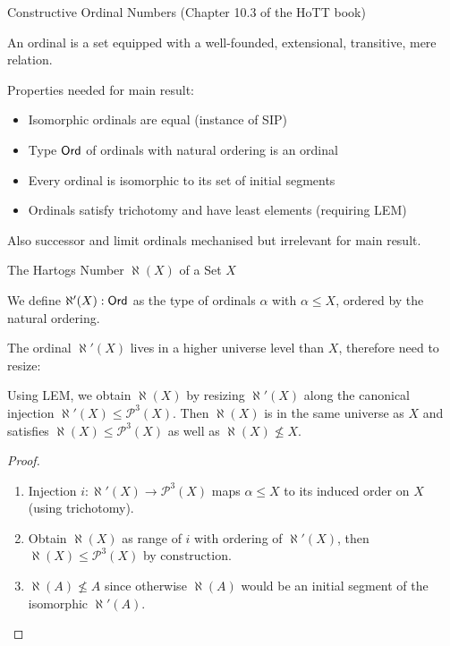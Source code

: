 \documentclass[xcolor=dvipsnames,compress,aspectratio=169,handout]{beamer}
\newcommand{\MCL}[1]{\ensuremath{\mathcal{#1}}\xspace} %
\newcommand{\Pow}{\MCL P}
\begin{document}
\begin{frame}{Constructive Ordinal Numbers (Chapter 10.3 of the HoTT book)}
	\begin{definition}
		An ordinal is a set equipped with a well-founded, extensional, transitive, mere relation.
	\end{definition}

	\pause
	\vspace{0.5cm}
	Properties needed for main result:
	\begin{itemize}
		\vspace{0.2cm}
		\item
		Isomorphic ordinals are equal (instance of SIP)
		\vspace{0.2cm}
		\item
		Type $\mathsf{Ord}$ of ordinals with natural ordering is an ordinal
		\vspace{0.2cm}
		\item
		Every ordinal is isomorphic to its set of initial segments
		\vspace{0.2cm}
		\item
		Ordinals satisfy trichotomy and have least elements (requiring LEM)
	\end{itemize}

	\pause
	\vspace{0.5cm}
	Also successor and limit ordinals mechanised but irrelevant for main result.
\end{frame}

\begin{frame}{The Hartogs Number $\aleph(X)$ of a Set $X$}
	\pause
	\begin{definition}
		We define $\aleph'(X):\mathsf{Ord}$ as the type of ordinals $\alpha$ with $\alpha \le X$, ordered by the natural ordering.
	\end{definition}

	\pause
	\vspace{0.3cm}
	The ordinal $\aleph'(X)$ lives in a higher universe level than $X$, therefore need to resize:
	\pause
	\begin{theorem}
		Using LEM, we obtain $\aleph(X)$ by resizing $\aleph'(X)$ along the canonical injection $\aleph'(X)\le\Pow^3(X)$.
		Then $\aleph(X)$ is in the same universe as $X$ and satisfies $\aleph(X)\le\Pow^3(X)$ as well as $\aleph(X)\not\le X$.
	\end{theorem}
	\pause
	\begin{proof}
		\begin{enumerate}
			\pause
			\item
			Injection $i: \aleph'(X)\to\Pow^3(X)$ maps $\alpha\le X$ to its induced order on $X$ (using trichotomy).
			\pause
			\item
			Obtain $\aleph(X)$ as range of $i$ with ordering of $\aleph'(X)$, then $\aleph(X)\le\Pow^3(X)$ by construction.
			\pause
			\item
			$\aleph(A)\not\le A$ since otherwise $\aleph(A)$ would be an initial segment of the isomorphic $\aleph'(A)$.
			\qedhere
		\end{enumerate}
	\end{proof}
\end{frame}
\end{document}
